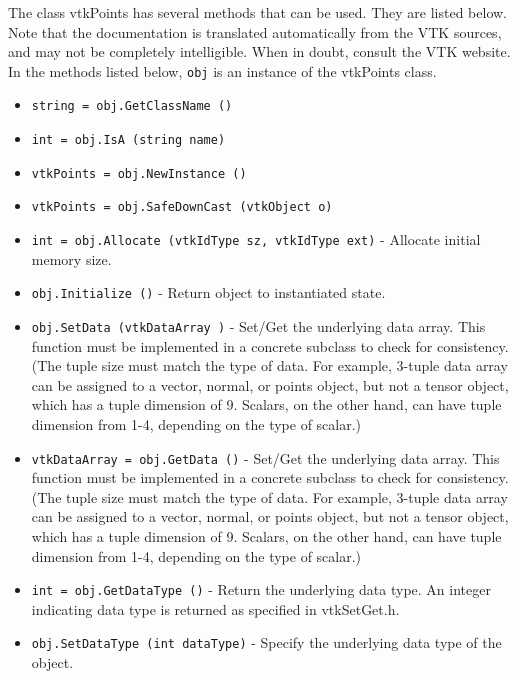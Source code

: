 The class vtkPoints has several methods that can be used.
  They are listed below.
Note that the documentation is translated automatically from the VTK sources,
and may not be completely intelligible.  When in doubt, consult the VTK website.
In the methods listed below, \verb|obj| is an instance of the vtkPoints class.
\begin{itemize}
\item  \verb|string = obj.GetClassName ()|

\item  \verb|int = obj.IsA (string name)|

\item  \verb|vtkPoints = obj.NewInstance ()|

\item  \verb|vtkPoints = obj.SafeDownCast (vtkObject o)|

\item  \verb|int = obj.Allocate (vtkIdType sz, vtkIdType ext)| -  Allocate initial memory size.

\item  \verb|obj.Initialize ()| -  Return object to instantiated state.

\item  \verb|obj.SetData (vtkDataArray )| -  Set/Get the underlying data array. This function must be implemented
 in a concrete subclass to check for consistency. (The tuple size must
 match the type of data. For example, 3-tuple data array can be assigned to
 a vector, normal, or points object, but not a tensor object, which has a 
 tuple dimension of 9. Scalars, on the other hand, can have tuple dimension
  from 1-4, depending on the type of scalar.)

\item  \verb|vtkDataArray = obj.GetData ()| -  Set/Get the underlying data array. This function must be implemented
 in a concrete subclass to check for consistency. (The tuple size must
 match the type of data. For example, 3-tuple data array can be assigned to
 a vector, normal, or points object, but not a tensor object, which has a 
 tuple dimension of 9. Scalars, on the other hand, can have tuple dimension
  from 1-4, depending on the type of scalar.)

\item  \verb|int = obj.GetDataType ()| -  Return the underlying data type. An integer indicating data type is 
 returned as specified in vtkSetGet.h.

\item  \verb|obj.SetDataType (int dataType)| -  Specify the underlying data type of the object.


\end{itemize}
